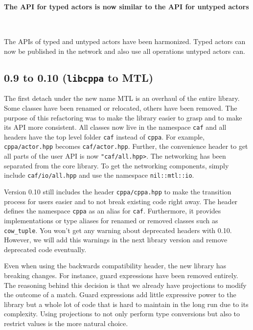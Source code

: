 \paragraph{The API for typed actors is now similar to the API for untyped actors}

~

The APIs of typed and untyped actors have been harmonized. Typed actors can now
be published in the network and also use all operations untyped actors can.

\clearpage
\subsection{0.9 to 0.10 (\texttt{libcppa} to MTL)}

The first detach under the new name MTL is an overhaul of the entire library.
Some classes have been renamed or relocated, others have been removed. The
purpose of this refactoring was to make the library easier to grasp and to make
its API more consistent. All classes now live in the namespace \texttt{caf} and
all headers have the top level folder \texttt{caf} instead of \texttt{cppa}.
For example, \texttt{cppa/actor.hpp} becomes \texttt{caf/actor.hpp}. Further,
the convenience header to get all parts of the user API is now
\texttt{"caf/all.hpp>}. The networking has been separated from the core
library. To get the networking components, simply include
\texttt{caf/io/all.hpp} and use the namespace \lstinline^nil::mtl::io^.

Version 0.10 still includes the header \texttt{cppa/cppa.hpp} to make the
transition process for users easier and to not break existing code right away.
The header defines the namespace \texttt{cppa} as an alias for \texttt{caf}.
Furthermore, it provides implementations or type aliases for renamed or removed
classes such as \lstinline^cow_tuple^. You won't get any warning about deprecated
headers with 0.10. However, we will add this warnings in the next library
version and remove deprecated code eventually.

Even when using the backwards compatibility header, the new library has
breaking changes. For instance, guard expressions have been removed entirely.
The reasoning behind this decision is that we already have projections to
modify the outcome of a match. Guard expressions add little expressive power to
the library but a whole lot of code that is hard to maintain in the long run
due to its complexity. Using projections to not only perform type conversions
but also to restrict values is the more natural choice.

